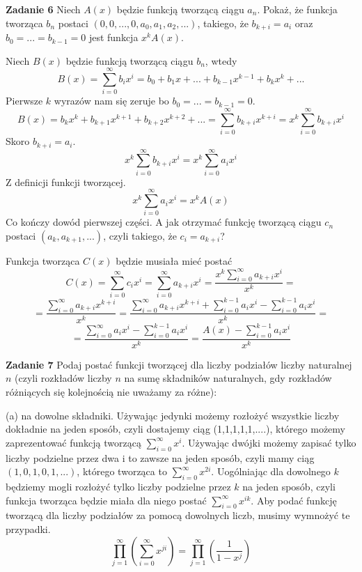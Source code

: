 \documentclass[12pt,a4paper]{article}
\begin{document}
\vskip 0.5cm
\noindent
\textbf{Zadanie 6} Niech \( A(x) \) będzie funkcją tworzącą ciągu \(a_n\). Pokaż, że funkcja tworząca \(b_n\) postaci \((0,0,...,0,a_0,a_1,a_2,...)\), takiego, że \(b_{k+i} = a_i\) oraz \(b_0 = ... = b_{k-1} = 0\) jest funkcja \( x^k A(x)\).

Niech \(B(x)\) będzie funkcją tworzącą ciągu \( b_n \), wtedy
\[
	B(x) = \sum_{i=0}^\infty b_i x^i = b_0 + b_1x + ... + b_{k-1}x^{k-1} + b_{k}x^{k} + ...
\]
Pierwsze \(k\) wyrazów nam się zeruje bo \(b_0 = ... = b_{k-1} = 0\).
\[
	B(x) = b_{k}x^{k} + b_{k+1}x^{k+1} + b_{k+2}x^{k+2} + ... 
	= \sum_{i = 0}^\infty b_{k+i}x^{k+i} 
	= x^k\sum_{i = 0}^\infty b_{k+i}x^i 
\]
Skoro \(b_{k+i} = a_i\).
\[
	x^k\sum_{i = 0}^\infty b_{k+i}x^i = x^k\sum_{i = 0}^\infty a_ix^i
\]
Z definicji funkcji tworzącej.
\[
	x^k\sum_{i = 0}^\infty a_ix^i = x^kA(x)
\]
Co kończy dowód pierwszej części. A jak otrzymać funkcję tworzącą ciągu \(c_n\) postaci \( (a_k, a_{k+1},...)\), czyli takiego, że \(c_i = a_{k+i} \)?

Funkcja tworząca \( C(x) \) będzie musiała mieć postać
\[
	C(x) = \sum_{i = 0}^\infty c_ix^i = \sum_{i = 0}^\infty a_{k + i}x^i 
	= \frac{x^k\sum_{i = 0}^\infty a_{k + i}x^i}{x^k} = 
\]
\[
	= \frac{\sum_{i = 0}^\infty a_{k + i}x^{k + i}}{x^k} 
	= \frac{\sum_{i = 0}^\infty a_{k + i}x^{k + i} + \sum_{i = 0}^{k -1} a_i x^i - \sum_{i = 0}^{k -1} a_i x^i  }{x^k} = 
\]
\[
	= \frac{\sum_{i = 0}^\infty a_i x^i - \sum_{i = 0}^{k -1} a_i x^i  }{x^k} 
	= \frac{A(x) - \sum_{i = 0}^{k -1} a_i x^i  }{x^k}
\]

\vskip 0.5cm
\noindent
\textbf{Zadanie 7} Podaj postać funkcji tworzącej dla liczby podziałów liczby naturalnej \( n\) (czyli rozkładów liczby \(n\) na sumę składników naturalnych, gdy rozkładów różniących się kolejnością nie uważamy za różne):

(a) na dowolne składniki. Używając jedynki możemy rozłożyć wszystkie liczby dokładnie na jeden sposób, czyli dostajemy ciąg (1,1,1,1,1,....), którego możemy zaprezentować funkcją tworzącą \( \sum_{i=0}^\infty x^i \). Używając dwójki możemy zapisać tylko liczby podzielne przez dwa i to zawsze na jeden sposób, czyli mamy ciąg \( (1,0,1,0,1,...) \), którego tworząca to \( \sum_{i=0}^\infty x^{2i} \). Uogólniając dla dowolnego \(k\) będziemy mogli rozłożyć tylko liczby podzielne przez \(k\) na jeden sposób, czyli funkcja tworząca będzie miała dla niego postać \( \sum_{i=0}^\infty x^{ik} \). Aby podać funkcję tworzącą dla liczby podziałów za pomocą dowolnych liczb, musimy wymnożyć te przypadki.
\[
	\prod_{j=1}^\infty \left( \sum_{i=0}^\infty x^{ji} \right) =
	\prod_{j=1}^\infty \left( \frac{1}{1-x^j} \right)
\]
\end{document}
